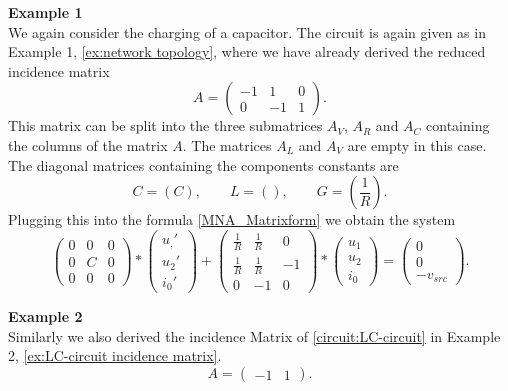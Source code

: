\textbf{Example 1} \label{ex:MNA} \\
We again consider the charging of a capacitor. The circuit is again given as in Example 1, \ref{ex:network topology}, where we have already derived the reduced incidence matrix
\begin{displaymath}
	A = 
	\left(
	\begin{matrix}
		-1 & 1 & 0 \\
		0 & -1 & 1 
	\end{matrix}
	\right).
\end{displaymath} 
 This matrix can be split into the three submatrices $A_V$, $A_R$ and $A_C$ containing the columns of the matrix $A$. The matrices $A_L$ and $A_V$ are empty in this case. The diagonal matrices containing the components constants are
 \begin{displaymath}
 	C = (C), \qquad L = (), \qquad G = (\frac{1}{R}).
 \end{displaymath}
Plugging this into the formula \eqref{MNA_Matrixform} we obtain the system
\begin{displaymath}
	\begin{pmatrix}
		0 & 0 & 0 \\
		0 & C & 0 \\
		0 & 0 & 0
	\end{pmatrix}
	*
	\begin{pmatrix}
		u_,' \\
		u_2' \\
		i_0'
	\end{pmatrix}
	+
	\begin{pmatrix}
		\frac{1}{R} & \frac{1}{R} & 0 \\
		\frac{1}{R} & \frac{1}{R} & -1 \\
		0 & -1 & 0 
	\end{pmatrix}
	*
	\begin{pmatrix}
		u_1 \\
		u_2 \\
		i_0
	\end{pmatrix}
	=
	\begin{pmatrix}
		0 \\
		0 \\
		-v_{src}
	\end{pmatrix}.
\end{displaymath}

\textbf{Example 2} \label{ex:LC-circuit MNA} \\
Similarly we also derived the incidence Matrix of \ref{circuit:LC-circuit} in Example 2, \eqref{ex:LC-circuit incidence matrix}.
\begin{displaymath}
	A = 
	\left(
	\begin{matrix}
		-1 & 1  
	\end{matrix}
	\right).
\end{displaymath}

